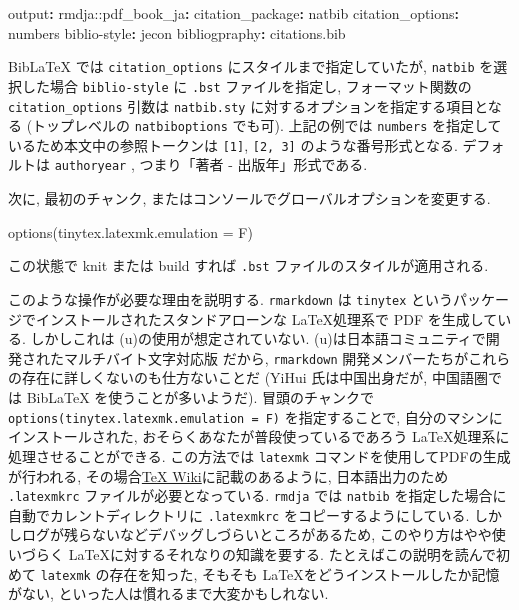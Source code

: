 \documentclass[
]{bxjsbook}
\newenvironment{Shaded}{\begin{snugshade}}{\end{snugshade}}
\newcommand{\AttributeTok}[1]{\textcolor[rgb]{0.77,0.63,0.00}{#1}}
\newcommand{\FunctionTok}[1]{\textcolor[rgb]{0.00,0.00,0.00}{#1}}
\newcommand{\KeywordTok}[1]{\textcolor[rgb]{0.13,0.29,0.53}{\textbf{#1}}}
\newcommand{\NormalTok}[1]{#1}
\theoremstyle{definition}
\theoremstyle{definition}
\theoremstyle{definition}
\theoremstyle{remark}
\begin{document}
\begin{Shaded}
\begin{Highlighting}[]
\FunctionTok{output}\KeywordTok{:}
\AttributeTok{  rmdja:}\FunctionTok{:pdf\_book\_ja}\KeywordTok{:}
\AttributeTok{    }\FunctionTok{citation\_package}\KeywordTok{:}\AttributeTok{ natbib}
\AttributeTok{    }\FunctionTok{citation\_options}\KeywordTok{:}\AttributeTok{ numbers}
\FunctionTok{biblio{-}style}\KeywordTok{:}\AttributeTok{ jecon}
\FunctionTok{bibliogpraphy}\KeywordTok{:}\AttributeTok{ citations.bib}
\end{Highlighting}
\end{Shaded}

BibLaTeX では \texttt{citation\_options} にスタイルまで指定していたが,
\texttt{natbib} を選択した場合 \texttt{biblio-style} に \texttt{.bst}
ファイルを指定し, フォーマット関数の \texttt{citation\_options} 引数は
\texttt{natbib.sty} に対するオプションを指定する項目となる
(トップレベルの \texttt{natbiboptions} でも可). 上記の例では
\texttt{numbers} を指定しているため本文中の参照トークンは
\texttt{{[}1{]}}, \texttt{{[}2,\ 3{]}} のような番号形式となる.
デフォルトは \texttt{authoryear} , つまり「著者 - 出版年」形式である.

次に, 最初のチャンク, またはコンソールでグローバルオプションを変更する.

\begin{Shaded}
\begin{Highlighting}[]
\FunctionTok{options}\NormalTok{(}\AttributeTok{tinytex.latexmk.emulation =}\NormalTok{ F)}
\end{Highlighting}
\end{Shaded}

この状態で knit または build すれば \texttt{.bst}
ファイルのスタイルが適用される.

このような操作が必要な理由を説明する. \texttt{rmarkdown} は
\texttt{tinytex} というパッケージでインストールされたスタンドアローンな
\LaTeX 処理系で PDF を生成している. しかしこれは
(u)\pBibTeX の使用が想定されていない.
(u)\pBibTeX は日本語コミュニティで開発されたマルチバイト文字対応版
\BibTeX だから, \texttt{rmarkdown}
開発メンバーたちがこれらの存在に詳しくないのも仕方ないことだ (YiHui
氏は中国出身だが, 中国語圏では BibLaTeX を使うことが多いようだ).
冒頭のチャンクで \texttt{options(tinytex.latexmk.emulation\ =\ F)}
を指定することで, 自分のマシンにインストールされた,
おそらくあなたが普段使っているであろう
\LaTeX 処理系に処理させることができる. この方法では \texttt{latexmk}
コマンドを使用してPDFの生成が行われる,
その場合\href{https://texwiki.texjp.org/?Latexmk}{TeX
Wiki}に記載のあるように, 日本語出力のため \texttt{.latexmkrc}
ファイルが必要となっている. \texttt{rmdja} では \texttt{natbib}
を指定した場合に自動でカレントディレクトリに \texttt{.latexmkrc}
をコピーするようにしている.
しかしログが残らないなどデバッグしづらいところがあるため,
このやり方はやや使いづらく \LaTeX に対するそれなりの知識を要する.
たとえばこの説明を読んで初めて \texttt{latexmk} の存在を知った, そもそも
\LaTeX をどうインストールしたか記憶がない,
といった人は慣れるまで大変かもしれない.
\end{document}
